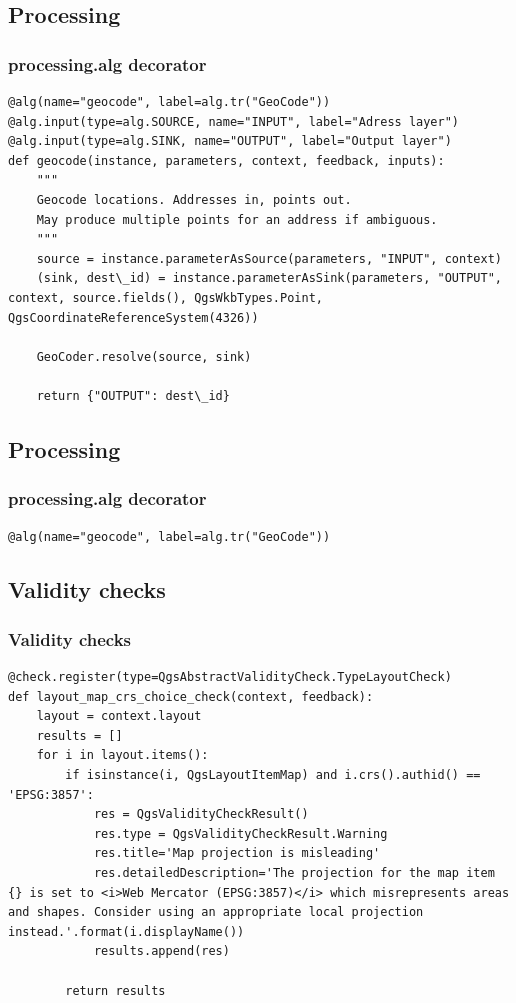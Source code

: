 \subsection{Processing}
\begin{frame}[fragile]
\frametitle{processing.alg decorator}
\begin{lstlisting}[style=pythoncode]
@alg(name="geocode", label=alg.tr("GeoCode"))
@alg.input(type=alg.SOURCE, name="INPUT", label="Adress layer")
@alg.input(type=alg.SINK, name="OUTPUT", label="Output layer")
def geocode(instance, parameters, context, feedback, inputs):
    """
    Geocode locations. Addresses in, points out.
    May produce multiple points for an address if ambiguous.
    """
	source = instance.parameterAsSource(parameters, "INPUT", context)
	(sink, dest\_id) = instance.parameterAsSink(parameters, "OUTPUT", context, source.fields(), QgsWkbTypes.Point, QgsCoordinateReferenceSystem(4326))

	GeoCoder.resolve(source, sink)
	
	return {"OUTPUT": dest\_id}
\end{lstlisting}
\end{frame}

\subsection{Processing}
\begin{frame}[fragile]
\frametitle{processing.alg decorator}
\begin{lstlisting}[style=pythoncode]
@alg(name="geocode", label=alg.tr("GeoCode"))
\end{lstlisting}

\end{frame}


\subsection{Validity checks}
\begin{frame}[fragile]
\frametitle{Validity checks}
\begin{lstlisting}[style=pythoncode]
@check.register(type=QgsAbstractValidityCheck.TypeLayoutCheck)
def layout_map_crs_choice_check(context, feedback):
	layout = context.layout
	results = []
	for i in layout.items():
		if isinstance(i, QgsLayoutItemMap) and i.crs().authid() == 'EPSG:3857':
			res = QgsValidityCheckResult()
			res.type = QgsValidityCheckResult.Warning
			res.title='Map projection is misleading'
			res.detailedDescription='The projection for the map item {} is set to <i>Web Mercator (EPSG:3857)</i> which misrepresents areas and shapes. Consider using an appropriate local projection instead.'.format(i.displayName())
			results.append(res)

		return results
\end{lstlisting}
\end{frame}
